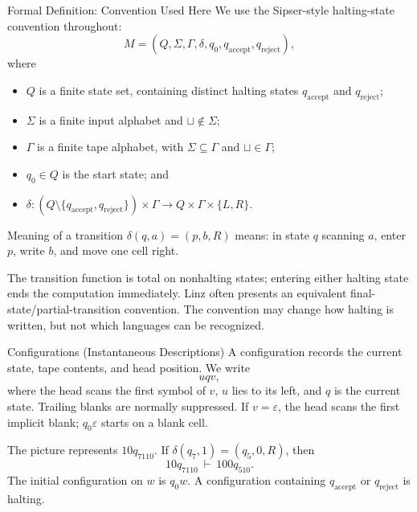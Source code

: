 \documentclass[10pt]{beamer}
\begin{document}
\begin{frame}{Formal Definition: Convention Used Here}
  \small
  We use the Sipser-style halting-state convention throughout:
  \[
    M=(Q,\Sigma,\Gamma,\delta,q_0,q_{\mathrm{accept}},q_{\mathrm{reject}}),
  \]
  where
  \begin{itemize}
    \item $Q$ is a finite state set, containing distinct halting states
      $q_{\mathrm{accept}}$ and $q_{\mathrm{reject}}$;
    \item $\Sigma$ is a finite input alphabet and $\sqcup\notin\Sigma$;
    \item $\Gamma$ is a finite tape alphabet, with $\Sigma\subseteq\Gamma$ and $\sqcup\in\Gamma$;
    \item $q_0\in Q$ is the start state; and
    \item
      $\delta:(Q\setminus\{q_{\mathrm{accept}},q_{\mathrm{reject}}\})\times\Gamma
      \to Q\times\Gamma\times\{L,R\}$.
  \end{itemize}
  \begin{block}{Meaning of a transition}
    $\delta(q,a)=(p,b,R)$ means: in state $q$ scanning $a$, enter $p$, write $b$,
    and move one cell right.
  \end{block}
  The transition function is total on nonhalting states; entering either
  halting state ends the computation immediately.
  \footnotesize Linz often presents an equivalent final-state/partial-transition convention.
  The convention may change how halting is written, but not which languages can be recognized.
\end{frame}

\begin{frame}{Configurations (Instantaneous Descriptions)}
  \small
  A configuration records the current state, tape contents, and head position. We write
  \[
    uqv,
  \]
  where the head scans the first symbol of $v$, $u$ lies to its left, and $q$ is the current state.
  Trailing blanks are normally suppressed. If $v=\varepsilon$, the head
  scans the first implicit blank; $q_0\varepsilon$ starts on a blank cell.

  \begin{center}
  \end{center}
  The picture represents $10q_7110$. If $\delta(q_7,1)=(q_5,0,R)$, then
  \[
    10q_7110\ \vdash\ 100q_510.
  \]
  The initial configuration on $w$ is $q_0w$. A configuration containing
  $q_{\mathrm{accept}}$ or $q_{\mathrm{reject}}$ is halting.
\end{frame}
\end{document}
